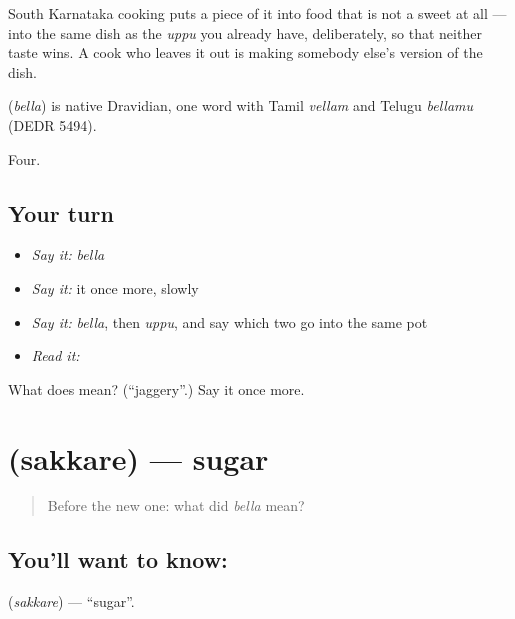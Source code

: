 South Karnataka cooking puts a piece of it into food that is not a sweet at all — into the same dish as the \emph{uppu} you already have, deliberately, so that neither taste wins. A cook who leaves it out is making somebody else's version of the dish.

\begin{cousinweb}
\textbf{} (\emph{bella}) is native Dravidian, one word with Tamil \emph{vellam} and Telugu \emph{bellamu} (DEDR 5494).
\end{cousinweb}

\begin{grammarlens}[title={What you've built}]
Four.
\end{grammarlens}

\subsection*{Your turn}
\begin{itemize}
\raggedright
  \item \emph{Say it:} \emph{bella}
  \item \emph{Say it:} it once more, slowly
  \item \emph{Say it:} \emph{bella}, then \emph{uppu}, and say which two go into the same pot
  \item \emph{Read it:} \textbf{}
\end{itemize}

\begin{tcolorbox}[breakable,colback=teal!4,colframe=teal!35!black,title={Before you move on}]
What does  mean? (\textquotedblleft{}jaggery\textquotedblright{}.) Say it once more.
\end{tcolorbox}
\section[\texorpdfstring{\kn{ಸಕ್ಕರೆ} (sakkare)}{ಸಕ್ಕರೆ (sakkare)}]{ (sakkare) — sugar}

\label{lesson:KA-C61-sugar}



\begin{quote}
Before the new one: what did \emph{bella} mean?
\end{quote}

\subsection*{You'll want to know: }
\textbf{} (\emph{sakkare}) — \textquotedblleft{}sugar\textquotedblright{}.

